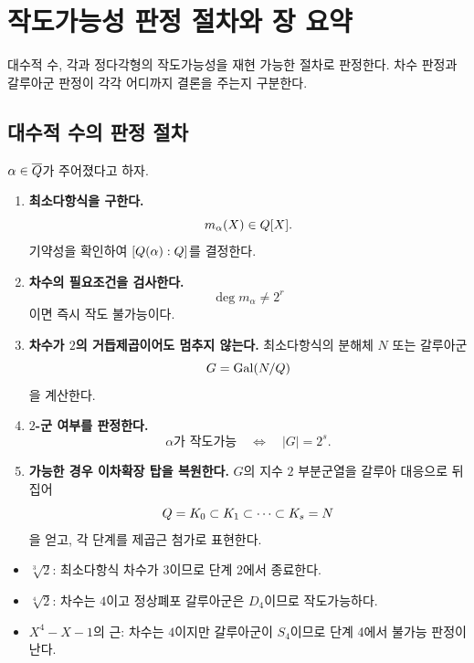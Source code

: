 \clearpage
\section{작도가능성 판정 절차와 장 요약}
\label{sec:construction-workflow-review}

\begin{learninggoal}
대수적 수, 각과 정다각형의 작도가능성을 재현 가능한 절차로 판정한다. 차수 판정과 갈루아군 판정이 각각 어디까지 결론을 주는지 구분한다.
\end{learninggoal}

\subsection{대수적 수의 판정 절차}

$\alpha\in\overline{Q}$가 주어졌다고 하자.

\begin{enumerate}[label=\textbf{단계 \arabic*.},leftmargin=28mm]
  \item \textbf{최소다항식을 구한다.}
  \[
    m_\alpha(X)\in Q[X].
  \]
  기약성을 확인하여 $[Q(\alpha):Q]$를 결정한다.

  \item \textbf{차수의 필요조건을 검사한다.}
  \[
    \deg m_\alpha\ne2^r
  \]
  이면 즉시 작도 불가능이다.

  \item \textbf{차수가 $2$의 거듭제곱이어도 멈추지 않는다.}
  최소다항식의 분해체 $N$ 또는 갈루아군
  \[
    G=\operatorname{Gal}(N/Q)
  \]
  을 계산한다.

  \item \textbf{$2$-군 여부를 판정한다.}
  \[
    \alpha\text{가 작도가능}
    \quad\Longleftrightarrow\quad
    |G|=2^s.
  \]

  \item \textbf{가능한 경우 이차확장 탑을 복원한다.}
  $G$의 지수 $2$ 부분군열을 갈루아 대응으로 뒤집어
  \[
    Q=K_0\subset K_1\subset\cdots\subset K_s=N
  \]
  을 얻고, 각 단계를 제곱근 첨가로 표현한다.
\end{enumerate}

\begin{example}[절차의 비교]
\begin{itemize}
  \item $\sqrt[3]2$: 최소다항식 차수가 $3$이므로 단계 2에서 종료한다.
  \item $\sqrt[4]2$: 차수는 $4$이고 정상폐포 갈루아군은 $D_4$이므로 작도가능하다.
  \item $X^4-X-1$의 근: 차수는 $4$이지만 갈루아군이 $S_4$이므로 단계 4에서 불가능 판정이 난다.
\end{itemize}
\end{example}

